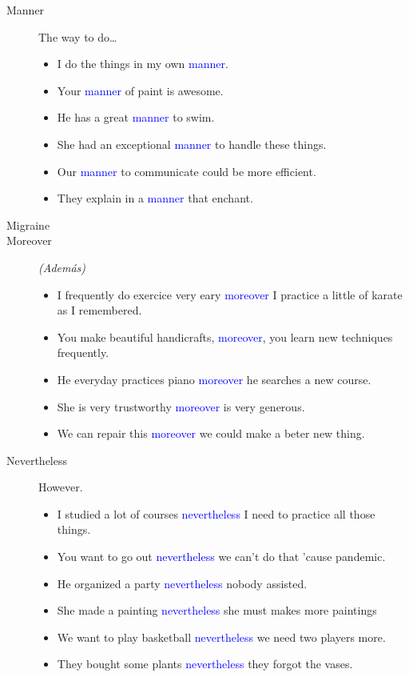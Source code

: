 \begin{multicols}{2}
\begin{description}
\item[Manner] The way to do\dots
\begin{itemize}
\item I do the things in my own \textcolor{blue}{manner}.
\item Your \textcolor{blue}{manner} of paint is awesome.
\item He has a great \textcolor{blue}{manner} to swim.
\item She had an exceptional \textcolor{blue}{manner} to handle these things.
\item Our \textcolor{blue}{manner} to communicate could be more efficient.
\item They explain in a \textcolor{blue}{manner} that enchant.
\end{itemize}

\item[Migraine]

\item[Moreover] \emph{(Además)}
\begin{itemize}
\item I frequently do exercice very eary \textcolor{blue}{moreover} I practice a little of karate as I remembered.
\item You make beautiful handicrafts, \textcolor{blue}{moreover}, you learn new techniques frequently.
\item He everyday practices piano \textcolor{blue}{moreover} he searches a new course.
\item She is very trustworthy \textcolor{blue}{moreover} is very generous.
\item We can repair this \textcolor{blue}{moreover} we could make a beter new thing.
\end{itemize}

\item[Nevertheless] However.
\begin{itemize}
\item I studied a lot of courses \textcolor{blue}{nevertheless} I need to practice all those things.
\item You want to go out \textcolor{blue}{nevertheless} we can't do that 'cause pandemic.
\item He organized a party \textcolor{blue}{nevertheless} nobody assisted.
\item She made a painting \textcolor{blue}{nevertheless} she must makes more paintings
\item We want to play basketball \textcolor{blue}{nevertheless} we need two players more.
\item They bought some plants \textcolor{blue}{nevertheless} they forgot the vases.
\end{itemize}


\end{description}
\end{multicols}
